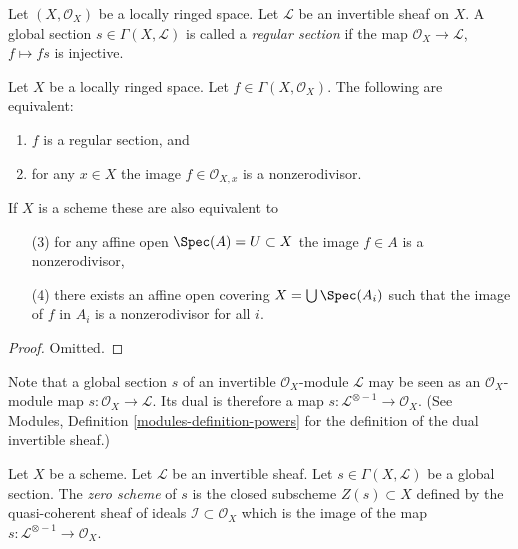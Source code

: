 \begin{definition}
\label{definition-regular-section}
Let $(X, \mathcal{O}_X)$ be a locally ringed space.
Let $\mathcal{L}$ be an invertible sheaf on $X$.
A global section $s \in \Gamma(X, \mathcal{L})$ is called a
{\it regular section} if the map $\mathcal{O}_X \to \mathcal{L}$,
$f \mapsto fs$ is injective.
\end{definition}

\begin{lemma}
\label{lemma-regular-section-structure-sheaf}
Let $X$ be a locally ringed space. Let $f \in \Gamma(X, \mathcal{O}_X)$.
The following are equivalent:
\begin{enumerate}
\item $f$ is a regular section, and
\item for any $x \in X$ the image $f \in \mathcal{O}_{X, x}$
is a nonzerodivisor.
\end{enumerate}
If $X$ is a scheme these are also equivalent to
\begin{enumerate}
\item[(3)] for any affine open $\Spec(A) = U \subset X$
the image $f \in A$ is a nonzerodivisor,
\item[(4)] there exists an affine open covering
$X = \bigcup \Spec(A_i)$ such that
the image of $f$ in $A_i$ is a nonzerodivisor for all $i$.
\end{enumerate}
\end{lemma}

\begin{proof}
Omitted.
\end{proof}

\noindent
Note that a global section $s$ of an invertible $\mathcal{O}_X$-module
$\mathcal{L}$ may be seen as an $\mathcal{O}_X$-module map
$s : \mathcal{O}_X \to \mathcal{L}$. Its dual is therefore a
map $s : \mathcal{L}^{\otimes -1} \to \mathcal{O}_X$.
(See Modules, Definition \ref{modules-definition-powers}
for the definition of the dual invertible sheaf.)

\begin{definition}
\label{definition-zero-scheme-s}
Let $X$ be a scheme. Let $\mathcal{L}$ be an invertible sheaf.
Let $s \in \Gamma(X, \mathcal{L})$ be a global section.
The {\it zero scheme} of $s$ is the closed subscheme $Z(s) \subset X$
defined by the quasi-coherent sheaf of ideals
$\mathcal{I} \subset \mathcal{O}_X$ which is the image of the
map $s : \mathcal{L}^{\otimes -1} \to \mathcal{O}_X$.
\end{definition}

